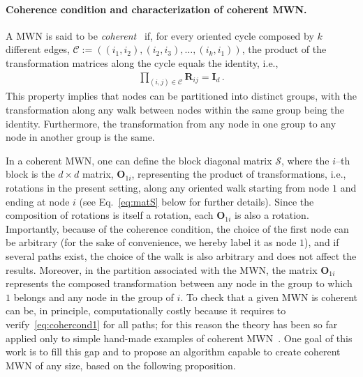 \documentclass[aps,showpacs,preprintnumbers,amsmath,amssymb,twocolumn,superscriptaddress,floatfix,nofootinbib,10pt,pre]{revtex4-1}
\begin{document}
\paragraph*{Coherence condition and characterization of coherent MWN.} A MWN is said to be \textit{coherent}~\cite{tian2025matrix} if, for every oriented cycle composed by $k$ different edges, $\mathcal{C}:=((i_1,i_2),(i_2,i_3),\dots,(i_k,i_1))$, the product of the transformation matrices along the cycle equals the identity, i.e.,
\begin{align}  
\label{eq:cohercond1}
\prod_{(i,j)\in\mathcal{C}}\mathbf{R}_{ij}=\mathbf{I}_d\,.
\end{align}
This property implies that nodes can be partitioned into distinct groups, with the transformation along any walk between nodes within the same group being the identity. Furthermore, the transformation from any node in one group to any node in another group is the same.

In a coherent MWN, one can define the block diagonal matrix $\mathcal{S}$, where the $i$--th block is the $d\times d$ matrix, $\mathbf{O}_{1i}$, representing the product of transformations, i.e., rotations in the present setting, along any oriented walk starting from node $1$ and ending at node $i$ (see Eq.~\eqref{eq:matS} below for further details). Since the composition of rotations is itself a rotation, each $\mathbf{O}_{1i}$ is also a rotation. Importantly, because of the coherence condition, the choice of the first node can be arbitrary (for the sake of convenience, we hereby label it as node $1$), and if several paths exist, the choice of the walk is also arbitrary and does not affect the results. Moreover, in the partition associated with the MWN, the matrix $\mathbf{O}_{1i}$ represents the composed transformation between any node in the group to which $1$ belongs and any node in the group of $i$. To check that a given MWN is coherent can be, in principle, computationally costly because it requires to verify~\eqref{eq:cohercond1} for all paths; for this reason the theory has been so far applied only to simple hand-made examples of coherent MWN~\cite{tian2025matrix,gallo2025global}. One goal of this work is to fill this gap and to propose an algorithm capable to create coherent MWN of any size, based on the following proposition.\\
\end{document}
